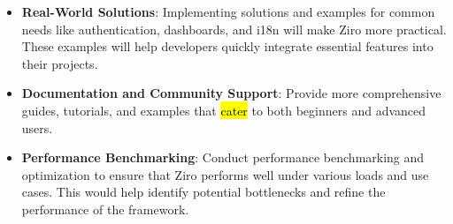 \begin{itemize}
	\item  \textbf{Real-World Solutions}: Implementing solutions and examples for common needs like authentication, dashboards, and i18n will make Ziro more practical. These examples will help developers quickly integrate essential features into their projects.

	\item  \textbf{Documentation and Community Support}: Provide more comprehensive guides, tutorials, and examples that \hl{cater} to both beginners and advanced users.

	\item  \textbf{Performance Benchmarking}: Conduct performance benchmarking and optimization to ensure that Ziro performs well under various loads and use cases. This would help identify potential bottlenecks and refine the performance of the framework.

\end{itemize}

\pagebreak
